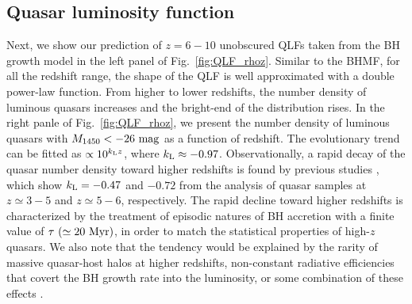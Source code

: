 \documentclass[twocolumn, twocolappendix]{aastex63}
\newcommand{\Muv}{M_{1450}}
\newcommand{\red}[1]{\textcolor{red}{ #1}}
\begin{document}
\begin{CJK*}{UTF8}{gbsn}
\subsection{Quasar luminosity function}
\label{sec:qlfglf}
Next, we show our prediction of $z=6-10$ unobscured QLFs taken from the BH growth model in the left panel of Fig.~\ref{fig:QLF_rhoz}.
Similar to the BHMF, for all the redshift range, the shape of the QLF is well approximated with a double power-law function.
From higher to lower redshifts, the number density of luminous quasars increases and the bright-end of the distribution rises.
In the right panle of Fig.~\ref{fig:QLF_rhoz}, we present the number density of luminous quasars with $\Muv <-26~{\rm mag}$ as a function of redshift.
The evolutionary trend can be fitted as $\propto 10^{k_{\rm L}z}$, where $k_{\rm L}\approx -0.97$.
Observationally, a rapid decay of the quasar number density toward higher redshifts is found by previous studies
\citep[e.g.,][]{2001AJ....122.2833F,2013ApJ...768..105M,2016ApJ...833..222J,2019ApJ...884...30W},
which show $k_{\rm L}= -0.47$ and $-0.72$ from the analysis of quasar samples at $z\simeq 3-5$ and $z\simeq 5-6$, respectively.
The rapid decline toward higher redshifts is characterized by the treatment of episodic natures of BH accretion with a finite value of
$\tau ~(\simeq 20~{\rm Myr})$, in order to match the statistical properties of high-$z$ quasars.
We also note that the tendency would be explained by the rarity of massive quasar-host halos at higher redshifts,
non-constant radiative efficiencies that covert the BH growth rate into the luminosity, or some combination of these effects
\citep[e.g.,][]{2010ApJ...718..231S}.




\end{CJK*}
\end{document}
